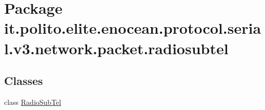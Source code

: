 \hypertarget{namespaceit_1_1polito_1_1elite_1_1enocean_1_1protocol_1_1serial_1_1v3_1_1network_1_1packet_1_1radiosubtel}{}\section{Package it.\+polito.\+elite.\+enocean.\+protocol.\+serial.\+v3.\+network.\+packet.\+radiosubtel}
\label{namespaceit_1_1polito_1_1elite_1_1enocean_1_1protocol_1_1serial_1_1v3_1_1network_1_1packet_1_1radiosubtel}
\subsection*{Classes}
\begin{DoxyCompactItemize}
\item 
class \hyperlink{classit_1_1polito_1_1elite_1_1enocean_1_1protocol_1_1serial_1_1v3_1_1network_1_1packet_1_1radiosubtel_1_1_radio_sub_tel}{Radio\+Sub\+Tel}
\end{DoxyCompactItemize}
